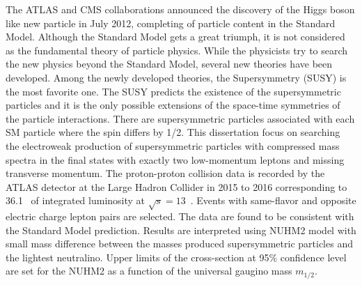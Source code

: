 The ATLAS and CMS collaborations announced the discovery of the Higgs boson like new particle in July 2012, completing of particle content in the Standard Model.
Although the Standard Model gets a great triumph, it is not considered as the fundamental theory of particle physics.
While the physicists try to search the new physics beyond the Standard Model, several new theories have been developed.
Among the newly developed theories, the Supersymmetry (SUSY) is the most favorite one.
The SUSY predicts the existence of the supersymmetric particles and it is the only possible extensions of the space-time symmetries of the particle interactions.
There are supersymmetric particles associated with each SM particle where the spin differs by 1/2.
This dissertation focus on searching the electroweak production of supersymmetric particles with compressed mass spectra in the final states with exactly two low-momentum leptons and missing transverse momentum.
The proton-proton collision data is recorded by the ATLAS detector at the Large Hadron Collider in 2015 to 2016 corresponding to 36.1~{\ifb} of integrated luminosity at $\sqrt{s} = 13$~{\TeV}.
Events with same-flavor and opposite electric charge lepton pairs are selected.
The data are found to be consistent with the Standard Model prediction.
Results are interpreted using NUHM2 model with small mass difference between the masses produced supersymmetric particles and the lightest neutralino.
Upper limits of the cross-section at 95\% confidence level are set for the NUHM2 as a function of the universal gaugino mass $m_{1/2}$.
